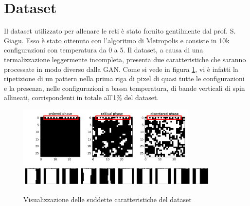 \documentclass[Lau, noexaminfo, oneside]{sapthesis} %
\begin{document}
\section{Dataset}
Il dataset utilizzato per allenare le reti è stato fornito gentilmente dal prof. S. Giagu. Esso è stato ottenuto con l'algoritmo di Metropolis e consiste in 10k configurazioni con temperatura da 0 a 5. Il dataset, a causa di una termalizzazione leggermente incompleta, presenta due caratteristiche che saranno processate in modo diverso dalla GAN. Come si vede in figura \ref{difetti}, vi è infatti la ripetizione di un pattern nella prima riga di pixel di quasi tutte le configurazioni e la presenza, nelle configurazioni a bassa temperatura, di bande verticali di spin allineati, corrispondenti in totale all'1\% del dataset.
\begin{figure}[H]
\includegraphics[width=0.8\textwidth]{dataset.png}\\
\includegraphics[width=0.9\textwidth]{difetti.png}
\centering
\caption{Visualizzazione delle suddette caratteristiche del dataset}
\label{difetti}
\end{figure}
\end{document}
